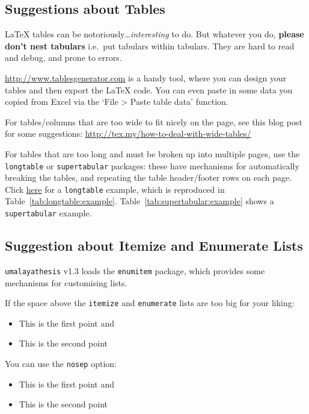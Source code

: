 \subsection{Suggestions about Tables}

\LaTeX{} tables can be notoriously\ldots \emph{interesting} to do. But whatever you do, \textbf{please don't nest tabulars} i.e.~put tabulars within tabulars. They are hard to read and debug, and prone to errors.

\url{http://www.tablesgenerator.com} is a handy tool, where you can design your tables and then export the \LaTeX{} code. You can even paste in some data you copied from Excel via the `File > Paste table data' function.

For tables/columns that are too wide to fit nicely on the page, see this blog post for some suggestions:
\url{http://tex.my/how-to-deal-with-wide-tables/}

For tables that are too long and must be broken up into multiple pages, use the \texttt{longtable} or \texttt{supertabular} packages: these have mechanisms for automatically breaking the tables, and repeating the table header/footer rows on each page. Click \href{https://www.overleaf.com/latex/examples/a-longtable-example/xxwzfxkxxjmc}{here} for a \texttt{longtable} example, which is reproduced in Table~\ref{tab:longtable:example}. Table~\ref{tab:supertabular:example} shows a \texttt{supertabular} example.

\subsection{Suggestion about Itemize and Enumerate Lists}

\texttt{umalayathesis} v1.3 loads the \texttt{enumitem} package, which provides some mechanisms for customising lists.

If the space above the \texttt{itemize} and \texttt{enumerate} lists are too big for your liking:
%
\begin{itemize}
  \item This is the first point and
  \item This is the second point
\end{itemize}

You can use the \texttt{nosep} option:

\begin{itemize}[nosep]
  \item This is the first point and
  \item This is the second point
\end{itemize}

